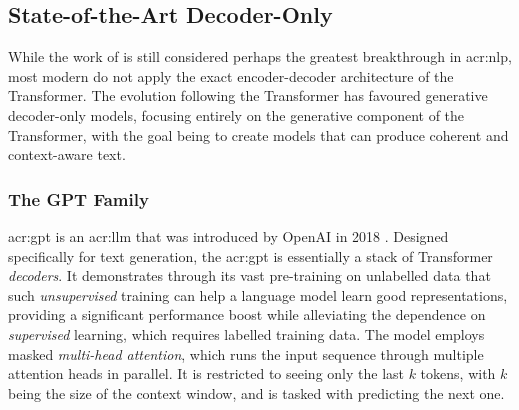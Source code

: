 \subsection[State-of-the-Art Decoder-Only LLMs]{State-of-the-Art Decoder-Only }
\label{subsec:sota-decoder-only-llms}

While the work of \cite{vaswaniAttentionAllYou2017} is still considered perhaps the greatest breakthrough in \gls{acr:nlp}, most modern  do not apply the exact encoder-decoder architecture of the Transformer. The evolution following the Transformer has favoured generative decoder-only models, focusing entirely on the generative component of the Transformer, with the goal being to create models that can produce coherent and context-aware text.

\subsubsection{The GPT Family}
\label{subusubsec:gpt}

\gls{acr:gpt} is an \acrshort{acr:llm} that was introduced by OpenAI in 2018 \citep{radfordImprovingLanguageUnderstanding2018}. Designed specifically for text generation, the \acrshort{acr:gpt} is essentially a stack of Transformer \textit{decoders}. It demonstrates through its vast pre-training on unlabelled data that such \textit{unsupervised} training can help a language model learn good representations, providing a significant performance boost while alleviating the dependence on \textit{supervised} learning, which requires labelled training data. The model employs masked \textit{multi-head attention}, which runs the input sequence through multiple attention heads in parallel. It is restricted to seeing only the last $k$ tokens, with $k$ being the size of the context window, and is tasked with predicting the next one.

